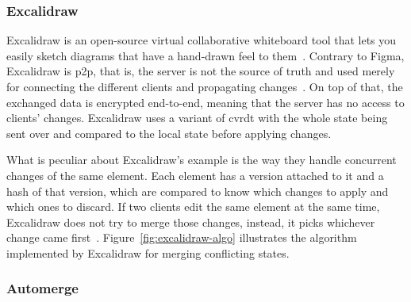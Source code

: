 \begin{toexclude}

	\subsubsection{Excalidraw}


	Excalidraw is an open-source virtual collaborative whiteboard tool that lets you easily sketch diagrams that have a hand-drawn feel to them~\autocite{noauthor_rethinking_nodate}.
	Contrary to Figma, Excalidraw is \acrfull{p2p}, that is, the server is not the source of truth and used merely for connecting the different clients and propagating changes~\autocite{noauthor_building_nodate}.
	On top of that, the exchanged data is encrypted end-to-end, meaning that the server has no access to clients' changes.
	Excalidraw uses a variant of \acrfull{cvrdt} with the whole state being sent over and compared to the local state before applying changes.


	What is peculiar about Excalidraw's example is the way they handle concurrent changes of the same element. Each element has a version attached to it and a hash of that version, which are compared to know which changes to apply and which ones to discard. If two clients edit the same element at the same time, Excalidraw does not try to merge those changes, instead, it picks whichever change came first~\autocite{noauthor_building_nodate}.
	Figure~\ref{fig:excalidraw-algo} illustrates the algorithm implemented by Excalidraw for merging conflicting states.


	\subsubsection{Automerge}


\end{toexclude}
